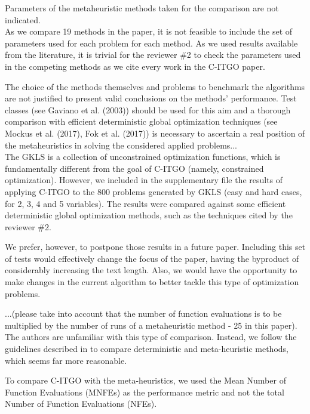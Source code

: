\vspace{1cm}


{\color{red} Parameters of the metaheuristic methods taken for the comparison are not indicated.} \\

As we compare 19 methods in the paper, it is not feasible to include the set of parameters used for each problem for each method. As we used results available from the literature, it is trivial for the reviewer \#2 to check the parameters used in the competing methods as we cite every work in the C-ITGO paper.


\vspace{1cm}


{\color{red} The choice of the methods themselves and problems to benchmark the algorithms are not justified to present valid conclusions on the methods' performance. Test classes (see Gaviano et al. (2003)) should be used for this aim and a thorough comparison with efficient deterministic global optimization techniques (see Mockus et al. (2017), Fok et al. (2017)) is necessary to ascertain a real position of the metaheuristics in solving the considered applied problems...} \\

The GKLS \citep{GKLS} is a collection of unconstrained optimization functions, which is fundamentally different from the goal of C-ITGO (namely, constrained optimization). However, we included in the supplementary file the results of applying C-ITGO to the 800 problems generated by GKLS (easy and hard cases, for 2, 3, 4 and 5 variables). The results were compared against some efficient deterministic global optimization methods, such as the techniques cited by the reviewer \#2.

We prefer, however, to postpone those results in a future paper. Including this set of tests would effectively change the focus of the paper, having the byproduct of considerably increasing the text length. Also, we would have the opportunity to make changes in the current algorithm to better tackle this type of optimization problems.


\vspace{1cm}



{\color{red} ...(please take into account that the number of function evaluations is to be multiplied by the number of runs of a metaheuristic method - 25 in this paper). } \\

The authors are unfamiliar with this type of comparison. Instead, we follow the guidelines described in \cite{NAT} to compare deterministic and meta-heuristic methods, which seems far more reasonable. 

To compare C-ITGO with the meta-heuristics, we used the Mean Number of Function Evaluations (MNFEs) as the performance metric and not the total Number of Function Evaluations (NFEs).


\vspace{1cm}